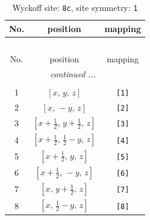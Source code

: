 \documentclass[fleqn,8pt]{jsarticle}
\begin{document}
\renewcommand{\arraystretch}{1.2}
\begin{longtable}{ccc}
\caption{Wyckoff site: {\tt 8c}, site symmetry: {\tt 1}}
 \\
 \hline \hline
No. & position & mapping \\ \hline \endfirsthead

\multicolumn{2}{l}{\tablename\ \thetable{}} \\
 \hline \hline
No. & position & mapping \\ \hline \endhead

 \hline \hline
\multicolumn{2}{r}{\footnotesize\it continued ...} \\ \endfoot

 \hline \hline
\multicolumn{2}{r}{} \\ \endlastfoot

1 & $\left[ x,\, y,\, z \right]$ & {\tt [1]} \\ \hline
2 & $\left[ x,\, - y,\, z \right]$ & {\tt [2]} \\ \hline
3 & $\left[ x + \frac{1}{2},\, y + \frac{1}{2},\, z \right]$ & {\tt [3]} \\ \hline
4 & $\left[ x + \frac{1}{2},\, \frac{1}{2} - y,\, z \right]$ & {\tt [4]} \\ \hline
5 & $\left[ x + \frac{1}{2},\, y,\, z \right]$ & {\tt [5]} \\ \hline
6 & $\left[ x + \frac{1}{2},\, - y,\, z \right]$ & {\tt [6]} \\ \hline
7 & $\left[ x,\, y + \frac{1}{2},\, z \right]$ & {\tt [7]} \\ \hline
8 & $\left[ x,\, \frac{1}{2} - y,\, z \right]$ & {\tt [8]} \\
\end{longtable}
\end{document}
